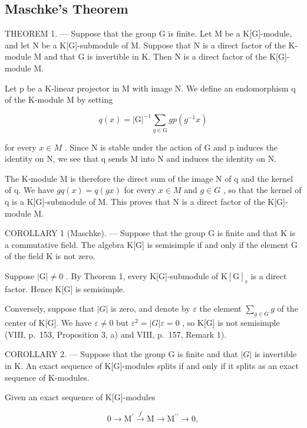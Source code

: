 \subsection{Maschke's Theorem}

THEOREM 1. --- Suppose that the group G is finite. Let M be a K{[}G{]}-module, and let N be a K{[}G{]}-submodule of M. Suppose that N is a direct factor of the K-module M and that \textbar G\textbar{} is invertible in K. Then N is a direct factor of the K{[}G{]}-module M.

Let p be a K-linear projector in M with image N. We define an endomorphism q of the K-module M by setting

\[
q (x) = | \mathrm{G} | ^ {- 1} \sum_ {g \in \mathrm{G}} g p (g ^ {- 1} x)
\]

for every \(x \in M\) . Since N is stable under the action of G and p induces the identity on N, we see that q sends M into N and induces the identity on N.

The K-module M is therefore the direct sum of the image N of q and the kernel of q. We have \(g q(x) = q(gx)\) for every \(x \in M\) and \(g \in G\) , so that the kernel of q is a K{[}G{]}-submodule of M. This proves that N is a direct factor of the K{[}G{]}-module M.

COROLLARY 1 (Maschke). --- Suppose that the group G is finite and that K is a commutative field. The algebra K{[}G{]} is semisimple if and only if the element \textbar G\textbar{} of the field K is not zero.

Suppose \(|\mathrm{G}| \neq 0\) . By Theorem 1, every K{[}G{]}-submodule of \(\mathrm{K}[\mathrm{G}]_s\) is a direct factor. Hence K{[}G{]} is semisimple.

Conversely, suppose that \(|G|\) is zero, and denote by \(\varepsilon\) the element \(\sum_{g\in G} g\) of the center of K{[}G{]}. We have \(\varepsilon \neq 0\) but \(\varepsilon^{2} = |G|\varepsilon = 0\) , so K{[}G{]} is not semisimple (VIII, p.~153, Proposition 3, a) and VIII, p.~157, Remark 1).

COROLLARY 2. --- Suppose that the group G is finite and that \(|G|\) is invertible in K. An exact sequence of K{[}G{]}-modules splits if and only if it splits as an exact sequence of K-modules.

Given an exact sequence of K{[}G{]}-modules

\[
0 \longrightarrow \mathrm{M} ^ {\prime} \stackrel {f} {\longrightarrow} \mathrm{M} \longrightarrow \mathrm{M} ^ {\prime \prime} \longrightarrow 0,
\]

